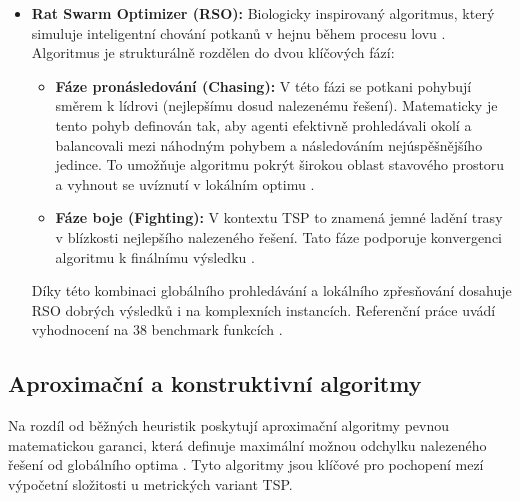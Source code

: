 \begin{itemize}
    \item \textbf{Rat Swarm Optimizer (RSO):} Biologicky inspirovaný algoritmus, který simuluje inteligentní chování potkanů v hejnu během procesu lovu \cite{dhiman2021rso}. Algoritmus je strukturálně rozdělen do dvou klíčových fází:
\begin{itemize}
    \item \textbf{Fáze pronásledování (Chasing):} V této fázi se potkani pohybují směrem k lídrovi (nejlepšímu dosud nalezenému řešení). Matematicky je tento pohyb definován tak, aby agenti efektivně prohledávali okolí a balancovali mezi náhodným pohybem a následováním nejúspěšnějšího jedince. To umožňuje algoritmu pokrýt širokou oblast stavového prostoru a vyhnout se uvíznutí v lokálním optimu \cite{dhiman2021rso}.
    \item \textbf{Fáze boje (Fighting):} V kontextu TSP to znamená jemné ladění trasy v blízkosti nejlepšího nalezeného řešení. Tato fáze podporuje konvergenci algoritmu k finálnímu výsledku \cite{dhiman2021rso}.
\end{itemize}
Díky této kombinaci globálního prohledávání a lokálního zpřesňování dosahuje RSO dobrých výsledků i na komplexních instancích. Referenční práce uvádí vyhodnocení na 38 benchmark funkcích \cite{dhiman2021rso}.
\end{itemize}


\subsection{Aproximační a konstruktivní algoritmy}
Na rozdíl od běžných heuristik poskytují aproximační algoritmy pevnou matematickou garanci, která definuje maximální možnou odchylku nalezeného řešení od globálního optima \cite{reinelt1994tsplib}.
Tyto algoritmy jsou klíčové pro pochopení mezí výpočetní složitosti u metrických variant TSP.

